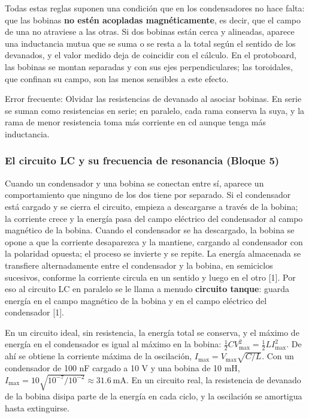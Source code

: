 \documentclass[11pt,letterpaper]{article}
\begin{document}
Todas estas reglas suponen una condición que en los condensadores no hace falta: que las bobinas \textbf{no estén acopladas magnéticamente}, es decir, que el campo de una no atraviese a las otras. Si dos bobinas están cerca y alineadas, aparece una inductancia mutua que se suma o se resta a la total según el sentido de los devanados, y el valor medido deja de coincidir con el cálculo. En el protoboard, las bobinas se montan separadas y con sus ejes perpendiculares; las toroidales, que confinan su campo, son las menos sensibles a este efecto.

\begin{nota}{Error frecuente:}
Olvidar las resistencias de devanado al asociar bobinas. En serie se suman como resistencias en serie; en paralelo, cada rama conserva la suya, y la rama de menor resistencia toma más corriente en cd aunque tenga más inductancia.
\end{nota}

\subsubsection{El circuito LC y su frecuencia de resonancia (Bloque 5)}

Cuando un condensador y una bobina se conectan entre sí, aparece un comportamiento que ninguno de los dos tiene por separado. Si el condensador está cargado y se cierra el circuito, empieza a descargarse a través de la bobina; la corriente crece y la energía pasa del campo eléctrico del condensador al campo magnético de la bobina. Cuando el condensador se ha descargado, la bobina se opone a que la corriente desaparezca y la mantiene, cargando al condensador con la polaridad opuesta; el proceso se invierte y se repite. La energía almacenada se transfiere alternadamente entre el condensador y la bobina, en semiciclos sucesivos, conforme la corriente circula en un sentido y luego en el otro [1]. Por eso al circuito LC en paralelo se le llama a menudo \textbf{circuito tanque}: guarda energía en el campo magnético de la bobina y en el campo eléctrico del condensador [1].

En un circuito ideal, sin resistencia, la energía total se conserva, y el máximo de energía en el condensador es igual al máximo en la bobina: $\tfrac{1}{2}CV_{\mathrm{max}}^2 = \tfrac{1}{2}LI_{\mathrm{max}}^2$. De ahí se obtiene la corriente máxima de la oscilación, $I_{\mathrm{max}} = V_{\mathrm{max}}\sqrt{C/L}$. Con un condensador de 100 nF cargado a 10 V y una bobina de 10 mH, $I_{\mathrm{max}} = 10\sqrt{10^{-7}/10^{-2}} \approx 31.6\ \text{mA}$. En un circuito real, la resistencia de devanado de la bobina disipa parte de la energía en cada ciclo, y la oscilación se amortigua hasta extinguirse.
\end{document}
